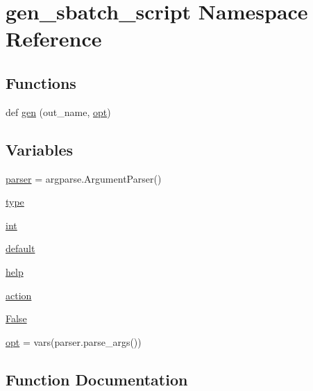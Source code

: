 \hypertarget{namespacegen__sbatch__script}{}\section{gen\+\_\+sbatch\+\_\+script Namespace Reference}
\label{namespacegen__sbatch__script}
\subsection*{Functions}
\begin{DoxyCompactItemize}
\item 
def \hyperlink{namespacegen__sbatch__script_aeec44cb55893e68c02b3e121c96bfb76}{gen} (out\+\_\+name, \hyperlink{namespacegen__sbatch__script_af6af7e8d9dc9e83b6774e24c19daab16}{opt})
\end{DoxyCompactItemize}
\subsection*{Variables}
\begin{DoxyCompactItemize}
\item 
\hyperlink{namespacegen__sbatch__script_ac43dee5d4a8d487195b0c514b4240b7e}{parser} = argparse.\+Argument\+Parser()
\item 
\hyperlink{namespacegen__sbatch__script_ad99f6e146084025f0156721f691dc1cf}{type}
\item 
\hyperlink{namespacegen__sbatch__script_ab42db9a16dc870616d23a53b62c66437}{int}
\item 
\hyperlink{namespacegen__sbatch__script_a4645a5a9d1f03663097b963a4a6b6a6b}{default}
\item 
\hyperlink{namespacegen__sbatch__script_a521986224ff65323046954b0c8f67408}{help}
\item 
\hyperlink{namespacegen__sbatch__script_a30ced515736488a43ed26cfc9bdaac71}{action}
\item 
\hyperlink{namespacegen__sbatch__script_a49d19184765b8c4046350288350ef7f7}{False}
\item 
\hyperlink{namespacegen__sbatch__script_af6af7e8d9dc9e83b6774e24c19daab16}{opt} = vars(parser.\+parse\+\_\+args())
\end{DoxyCompactItemize}


\subsection{Function Documentation}
\mbox{\label{namespacegen__sbatch__script_aeec44cb55893e68c02b3e121c96bfb76}} 
